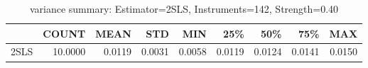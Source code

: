 \begin{table}[ht]
\centering
\caption{variance summary: Estimator=2SLS, Instruments=142, Strength=0.40}
\begin{tabular}{lrrrrrrrr}
\toprule
 & COUNT & MEAN & STD & MIN & 25\% & 50\% & 75\% & MAX \\
\midrule
2SLS & 10.0000 & 0.0119 & 0.0031 & 0.0058 & 0.0119 & 0.0124 & 0.0141 & 0.0150 \\
\bottomrule
\end{tabular}
\end{table}

